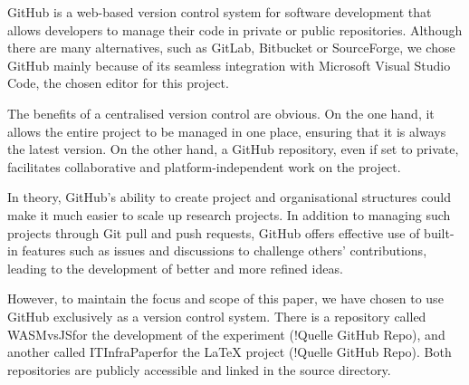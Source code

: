 GitHub is a web-based version control system for software development that allows developers to manage their code in private or public repositories. Although there are many alternatives, such as GitLab, Bitbucket or SourceForge, we chose GitHub mainly because of its seamless integration with Microsoft Visual Studio Code, the chosen editor for this project.

The benefits of a centralised version control are obvious. On the one hand, it allows the entire project to be managed in one place, ensuring that it is always the latest version. On the other hand, a GitHub repository, even if set to private, facilitates collaborative and platform-independent work on the project.

In theory, GitHub's ability to create project and organisational structures could make it much easier to scale up research projects. In addition to managing such projects through Git pull and push requests, GitHub offers effective use of built-in features such as issues and discussions to challenge others' contributions, leading to the development of better and more refined ideas.

However, to maintain the focus and scope of this paper, we have chosen to use GitHub exclusively as a version control system. There is a repository called \dq WASMvsJS\dq  for the development of the experiment (!Quelle GitHub Repo), and another called \dq ITInfraPaper\dq  for the \LaTeX{} project (!Quelle GitHub Repo). Both repositories are publicly accessible and linked in the source directory.